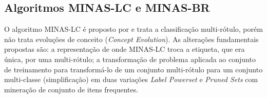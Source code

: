 
\subsection{Algoritmos MINAS-LC e MINAS-BR}\label{sub:minas-derivados}

O algoritmo MINAS-LC é proposto por  e trata a classificação
multi-rótulo, porém não trata evoluções de conceito (\emph{Concept Evolution}).
As alterações fundamentais propostas são:
a representação de \cluster onde MINAS-LC troca a etiqueta, que era única, por uma multi-rótulo;
a transformação de problema aplicada ao conjunto de treinamento para transformá-lo de um
conjunto multi-rótulo para um conjunto multi-classe (simplificação)
em duas variações \emph{Label Powerset} e \emph{Pruned Sets} com
mineração de conjunto de itens frequentes.

